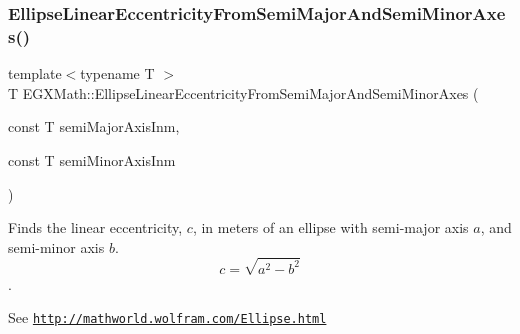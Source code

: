 \subsubsection{\texorpdfstring{Ellipse\+Linear\+Eccentricity\+From\+Semi\+Major\+And\+Semi\+Minor\+Axes()}{EllipseLinearEccentricityFromSemiMajorAndSemiMinorAxes()}}
{\footnotesize\ttfamily template$<$typename T $>$ \\
T E\+G\+X\+Math\+::\+Ellipse\+Linear\+Eccentricity\+From\+Semi\+Major\+And\+Semi\+Minor\+Axes (\begin{DoxyParamCaption}\item[{const T}]{semi\+Major\+Axis\+Inm,  }\item[{const T}]{semi\+Minor\+Axis\+Inm }\end{DoxyParamCaption})}



Finds the linear eccentricity, $c$, in meters of an ellipse with semi-\/major axis $a$, and semi-\/minor axis $b$. \[ c=\sqrt{a^2-b^2} \]. 

See \href{http://mathworld.wolfram.com/Ellipse.html}{\tt http\+://mathworld.\+wolfram.\+com/\+Ellipse.\+html}


